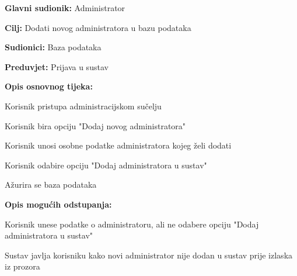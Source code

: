 					\noindent {}
					\begin{packed_item}
	
						\item \textbf{Glavni sudionik: } Administrator
						\item  \textbf{Cilj:} Dodati novog administratora u bazu podataka
						\item  \textbf{Sudionici:} Baza podataka
						\item  \textbf{Preduvjet:} Prijava u sustav
						\item  \textbf{Opis osnovnog tijeka:}
						
						\item[] \begin{packed_enum}
	
							\item Korisnik pristupa administracijskom sučelju
							\item Korisnik bira opciju "Dodaj novog administratora"
							\item Korisnik unosi osobne podatke administratora kojeg želi dodati
							\item Korisnik odabire opciju "Dodaj administratora u sustav"
							\item Ažurira se baza podataka

					
						\end{packed_enum}

						\item  \textbf{Opis mogućih odstupanja:}
						
						\item[] \begin{packed_item}
	
							\item[3.a]  Korisnik unese podatke o administratoru, ali ne odabere opciju "Dodaj administratora u sustav"
							\item[] \begin{packed_enum}
								
								\item Sustav javlja korisniku kako novi administrator nije dodan u sustav prije izlaska iz prozora
								
							\end{packed_enum}
							
						\end{packed_item}
			
					\end{packed_item}
				
